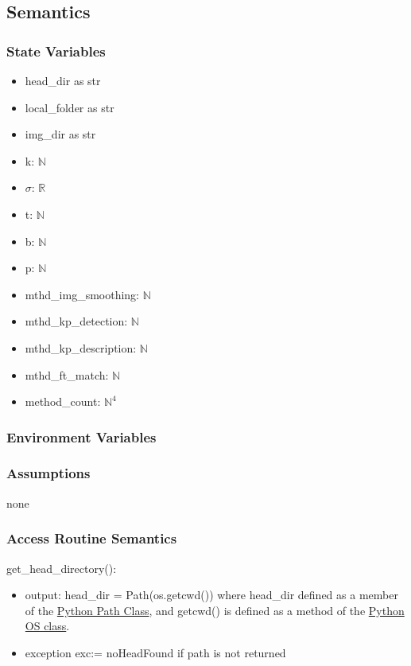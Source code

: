 \documentclass[12pt, titlepage]{article}
\begin{document}
\subsection{Semantics}
\subsubsection{State Variables}
\begin{itemize}
  \item head\_dir as str
  \item local\_folder as str
  \item img\_dir as str
  \item k: $\mathbb{N}$
  \item $\sigma$: $\mathbb{R}$
  \item t: $\mathbb{N}$
  \item b: $\mathbb{N}$
  \item p: $\mathbb{N}$
  \item mthd\_img\_smoothing: $\mathbb{N}$
  \item mthd\_kp\_detection: $\mathbb{N}$
  \item mthd\_kp\_description: $\mathbb{N}$
  \item mthd\_ft\_match: $\mathbb{N}$
  \item method\_count: $\mathbb{N}^4$
\end{itemize}


\subsubsection{Environment Variables}

\subsubsection{Assumptions}
none 

\subsubsection{Access Routine Semantics}
\noindent get\_head\_directory():
\begin{itemize}
  \item output: head\_dir = Path(os.getcwd()) where head\_dir defined as 
  a member of the \href{https://docs.python.org/3/library/os.path.html}{Python Path Class}, and getcwd() is defined as a method of the \href{https://docs.python.org/3/library/os.html}{Python OS class}.
  \item exception exc:= noHeadFound if path is not returned
\end{itemize}
\end{document}
